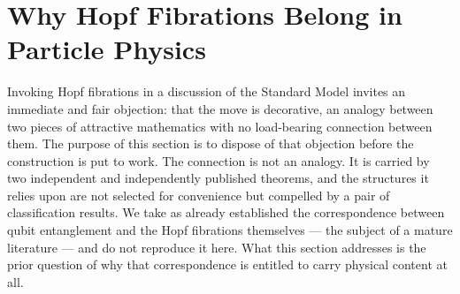 %
%      
%      
%      
%

\section{Why Hopf Fibrations Belong in Particle Physics}
\label{sec:hopf-justification}

Invoking Hopf fibrations in a discussion of the Standard Model invites an immediate and fair
objection: that the move is decorative, an analogy between two pieces of attractive mathematics
with no load-bearing connection between them. The purpose of this section is to dispose of that
objection before the construction is put to work. The connection is not an analogy. It is
carried by two independent and independently published theorems, and the structures it relies
upon are not selected for convenience but compelled by a pair of classification results. We take
as already established the correspondence between qubit entanglement and the Hopf fibrations
themselves --- the subject of a mature literature
\autocite{mosseri2001hopf,bernevigchen2003geometry} --- and do not reproduce it here. What this
section addresses is the prior question of why that correspondence is entitled to carry physical
content at all.

